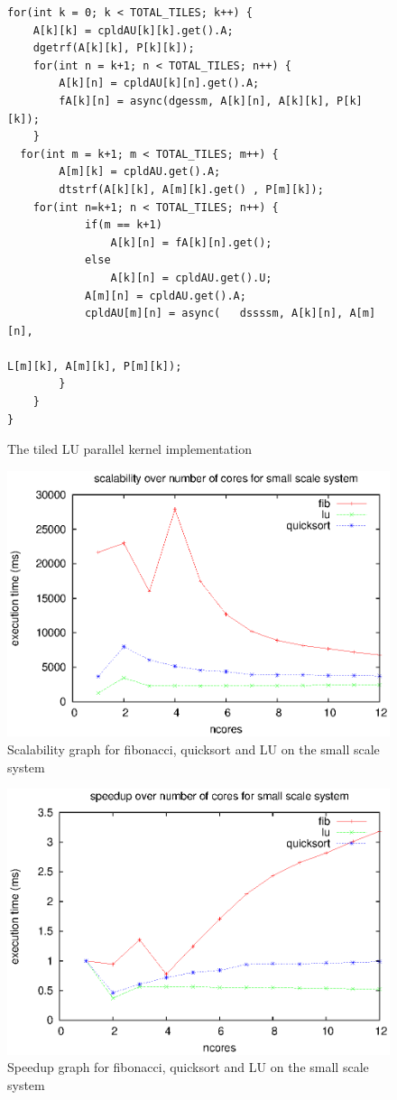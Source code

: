 \begin{figure}[!ht]
\begin{lstlisting}
for(int k = 0; k < TOTAL_TILES; k++) {
	A[k][k] = cpldAU[k][k].get().A;
	dgetrf(A[k][k], P[k][k]);
	for(int n = k+1; n < TOTAL_TILES; n++) {
		A[k][n] = cpldAU[k][n].get().A;
		fA[k][n] = async(dgessm, A[k][n], A[k][k], P[k][k]);
	}
  for(int m = k+1; m < TOTAL_TILES; m++) {
		A[m][k] = cpldAU.get().A;
		dtstrf(A[k][k], A[m][k].get() , P[m][k]);
  	for(int n=k+1; n < TOTAL_TILES; n++) {
			if(m == k+1)
				A[k][n] = fA[k][n].get();
			else
				A[k][n] = cpldAU.get().U;
			A[m][n] = cpldAU.get().A;
			cpldAU[m][n] = async(	dssssm, A[k][n], A[m][n], 
														L[m][k], A[m][k], P[m][k]);
		}
	}
}

\end{lstlisting}
\caption{The tiled LU parallel kernel implementation}
\label{lst:tiledLUpar}
\end{figure}

\begin{figure}[!ht]
\centering
\includegraphics[width=0.7\columnwidth]{figures/apps_scalability_minititan}
\caption{Scalability graph for fibonacci, quicksort and LU on the small scale system}
\label{fig:apps_scalability_minititan}
\end{figure}

\begin{figure}[!ht]
\centering
\includegraphics[width=0.7\columnwidth]{figures/apps_speedup_minititan}
\caption{Speedup graph for fibonacci, quicksort and LU on the small scale system}
\label{fig:apps_speedup_minititan}
\end{figure}

